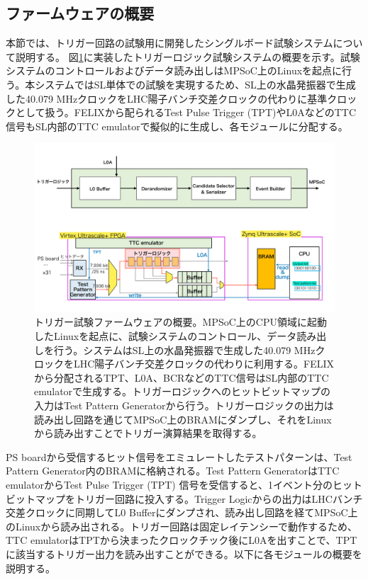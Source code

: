 \subsection*{ファームウェアの概要}
本節では、トリガー回路の試験用に開発したシングルボード試験システムについて説明する。
図\ref{TestSystem_Overview}に実装したトリガーロジック試験システムの概要を示す。試験システムのコントロールおよびデータ読み出しはMPSoC上のLinuxを起点に行う。本システムではSL単体での試験を実現するため、SL上の水晶発振器で生成した40.079 MHzクロックをLHC陽子バンチ交差クロックの代わりに基準クロックとして扱う。FELIXから配られるTest Pulse Trigger (TPT)やL0AなどのTTC信号もSL内部のTTC emulatorで擬似的に生成し、各モジュールに分配する。

\begin{figure} 
\centering
\includegraphics[width=16cm]{fig/Test/TestSystem_overview.pdf}
\caption[トリガー試験ファームウェアの概要]{トリガー試験ファームウェアの概要。MPSoC上のCPU領域に起動したLinuxを起点に、試験システムのコントロール、データ読み出しを行う。システムはSL上の水晶発振器で生成した40.079 MHzクロックをLHC陽子バンチ交差クロックの代わりに利用する。FELIXから分配されるTPT、L0A、BCRなどのTTC信号はSL内部のTTC emulatorで生成する。トリガーロジックへのヒットビットマップの入力はTest Pattern Generatorから行う。トリガーロジックの出力は読み出し回路を通じてMPSoC上のBRAMにダンプし、それをLinuxから読み出すことでトリガー演算結果を取得する。}
\label{TestSystem_Overview}
\end{figure}

PS boardから受信するヒット信号をエミュレートしたテストパターンは、Test Pattern Generator内のBRAMに格納される。Test Pattern GeneratorはTTC emulatorからTest Pulse Trigger (TPT) 信号を受信すると、1イベント分のヒットビットマップをトリガー回路に投入する。Trigger Logicからの出力はLHCバンチ交差クロックに同期してL0 Bufferにダンプされ、読み出し回路を経てMPSoC上のLinuxから読み出される。トリガー回路は固定レイテンシーで動作するため、TTC emulatorはTPTから決まったクロックチック後にL0Aを出すことで、TPTに該当するトリガー出力を読み出すことができる。以下に各モジュールの概要を説明する。

